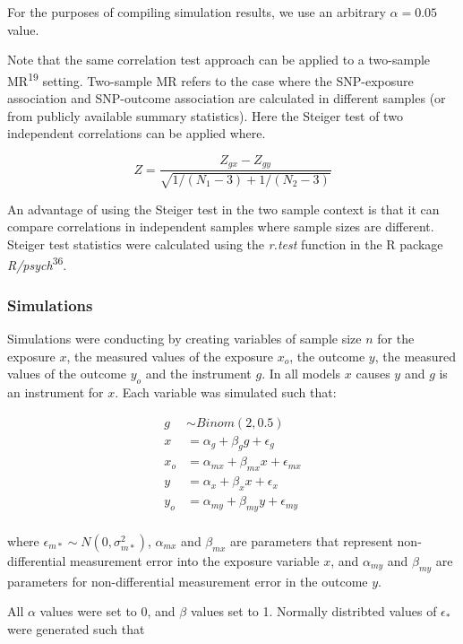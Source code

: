\documentclass[]{article}
\begin{document}
For the purposes of compiling simulation results, we use an arbitrary
\(\alpha = 0.05\) value.

Note that the same correlation test approach can be applied to a
two-sample MR\textsuperscript{19} setting. Two-sample MR refers to the
case where the SNP-exposure association and SNP-outcome association are
calculated in different samples (or from publicly available summary
statistics). Here the Steiger test of two independent correlations can
be applied where.

\[
Z = \frac{Z_{gx} - Z_{gy}} { \sqrt{ 1 / (N_{1} - 3) + 1 / (N_{2} - 3) } }
\]

An advantage of using the Steiger test in the two sample context is that
it can compare correlations in independent samples where sample sizes
are different. Steiger test statistics were calculated using the
\emph{r.test} function in the R package
\emph{R/psych}\textsuperscript{36}.

\subsubsection{Simulations}\label{simulations}

Simulations were conducting by creating variables of sample size \(n\)
for the exposure \(x\), the measured values of the exposure \(x_o\), the
outcome \(y\), the measured values of the outcome \(y_o\) and the
instrument \(g\). In all models \(x\) causes \(y\) and \(g\) is an
instrument for \(x\). Each variable was simulated such that:

\[
\begin{aligned}
g & \sim Binom(2, 0.5) \\
x & = \alpha_g + \beta_g g + \epsilon_g \\
x_o & = \alpha_{mx} + \beta_{mx} x + \epsilon_{mx} \\
y & = \alpha_x + \beta_x x + \epsilon_x \\
y_o & = \alpha_{my} + \beta_{my} y + \epsilon_{my} \\
\end{aligned}
\]

where \(\epsilon_{m*} \sim N(0, \sigma^2_{m*})\), \(\alpha_{mx}\) and
\(\beta_{mx}\) are parameters that represent non-differential
measurement error into the exposure variable \(x\), and \(\alpha_{my}\)
and \(\beta_{my}\) are parameters for non-differential measurement error
in the outcome \(y\).

All \(\alpha\) values were set to 0, and \(\beta\) values set to 1.
Normally distribted values of \(\epsilon_*\) were generated such that
\end{document}
